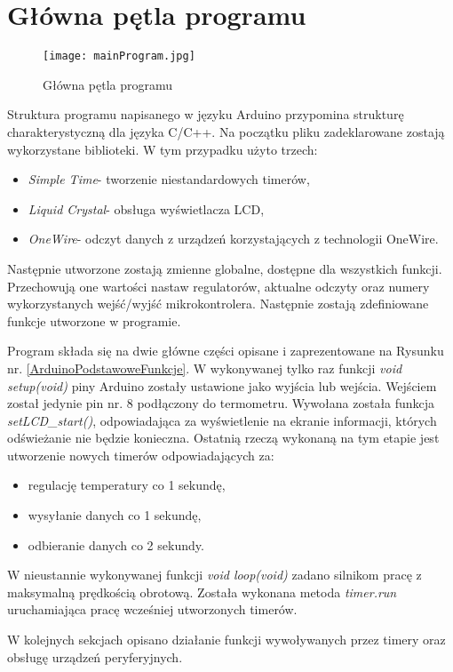 \section{Główna pętla programu} %
\begin{figure}[H]
	\centering
	\texttt{[image: mainProgram.jpg]}
	\caption{Główna pętla programu}
\end{figure}
Struktura programu napisanego w języku Arduino przypomina strukturę charakterystyczną dla języka C/C++. Na początku pliku zadeklarowane zostają wykorzystane biblioteki. W tym przypadku użyto trzech:
\begin{itemize}
\item \textit{Simple Time}- tworzenie niestandardowych timerów,
\item \textit{Liquid Crystal}- obsługa wyświetlacza LCD,
\item \textit{OneWire}- odczyt danych z urządzeń korzystających z technologii OneWire.
\end{itemize}
Następnie utworzone zostają zmienne globalne, dostępne dla wszystkich funkcji. 
Przechowują one wartości nastaw regulatorów, aktualne odczyty oraz numery wykorzystanych wejść/wyjść mikrokontrolera. Następnie zostają zdefiniowane funkcje utworzone w programie.

Program składa się na dwie główne części opisane i zaprezentowane na Rysunku nr. \ref{ArduinoPodstawoweFunkcje}. W wykonywanej tylko raz funkcji \textit{void setup(void)} piny Arduino zostały ustawione jako wyjścia lub wejścia. Wejściem został jedynie pin nr. 8 podłączony do termometru. Wywołana została funkcja \textit{setLCD\_start()}, odpowiadająca za wyświetlenie na ekranie informacji, których odświeżanie nie będzie konieczna. Ostatnią rzeczą wykonaną na tym etapie jest utworzenie nowych timerów odpowiadających za:
\begin{itemize}
\item regulację temperatury co 1 sekundę,
\item wysyłanie danych co 1 sekundę,
\item odbieranie danych co 2 sekundy.
\end{itemize}

W nieustannie wykonywanej funkcji \textit{void loop(void)} zadano silnikom pracę z maksymalną prędkością obrotową. Została wykonana metoda \textit{timer.run} uruchamiająca pracę wcześniej utworzonych timerów.

W kolejnych sekcjach opisano działanie funkcji wywoływanych przez timery oraz obsługę urządzeń peryferyjnych.

